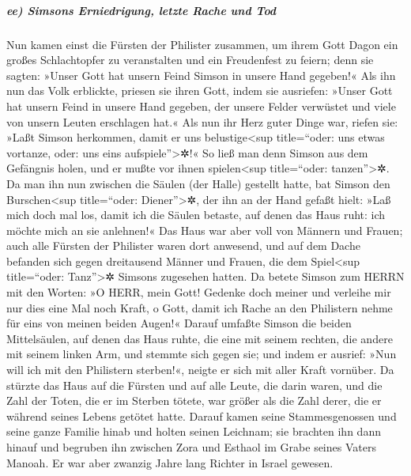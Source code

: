 \hypertarget{ee-simsons-erniedrigung-letzte-rache-und-tod}{%
\subparagraph{ee) Simsons Erniedrigung, letzte Rache und
Tod}\label{ee-simsons-erniedrigung-letzte-rache-und-tod}}

Nun kamen einst die Fürsten der Philister zusammen, um
ihrem Gott Dagon ein großes Schlachtopfer zu veranstalten und ein
Freudenfest zu feiern; denn sie sagten: »Unser Gott hat unsern Feind
Simson in unsere Hand gegeben!« Als ihn nun das Volk
erblickte, priesen sie ihren Gott, indem sie ausriefen: »Unser Gott hat
unsern Feind in unsere Hand gegeben, der unsere Felder verwüstet und
viele von unsern Leuten erschlagen hat.« Als nun ihr Herz
guter Dinge war, riefen sie: »Laßt Simson herkommen, damit er uns
belustige\textless sup title=``oder: uns etwas vortanze, oder: uns eins
aufspiele''\textgreater✲!« So ließ man denn Simson aus dem Gefängnis
holen, und er mußte vor ihnen spielen\textless sup title=``oder:
tanzen''\textgreater✲. Da man ihn nun zwischen die Säulen (der Halle)
gestellt hatte, bat Simson den Burschen\textless sup
title=``oder: Diener''\textgreater✲, der ihn an der Hand gefaßt hielt:
»Laß mich doch mal los, damit ich die Säulen betaste, auf denen das Haus
ruht: ich möchte mich an sie anlehnen!« Das Haus war aber
voll von Männern und Frauen; auch alle Fürsten der Philister waren dort
anwesend, und auf dem Dache befanden sich gegen dreitausend Männer und
Frauen, die dem Spiel\textless sup title=``oder: Tanz''\textgreater✲
Simsons zugesehen hatten. Da betete Simson zum HERRN mit
den Worten: »O HERR, mein Gott! Gedenke doch meiner und verleihe mir nur
dies eine Mal noch Kraft, o Gott, damit ich Rache an den Philistern
nehme für eins von meinen beiden Augen!« Darauf umfaßte
Simson die beiden Mittelsäulen, auf denen das Haus ruhte, die eine mit
seinem rechten, die andere mit seinem linken Arm, und stemmte sich gegen
sie; und indem er ausrief: »Nun will ich mit den
Philistern sterben!«, neigte er sich mit aller Kraft vornüber. Da
stürzte das Haus auf die Fürsten und auf alle Leute, die darin waren,
und die Zahl der Toten, die er im Sterben tötete, war größer als die
Zahl derer, die er während seines Lebens getötet hatte.
Darauf kamen seine Stammesgenossen und seine ganze
Familie hinab und holten seinen Leichnam; sie brachten ihn dann hinauf
und begruben ihn zwischen Zora und Esthaol im Grabe seines Vaters
Manoah. Er war aber zwanzig Jahre lang Richter in Israel gewesen.

